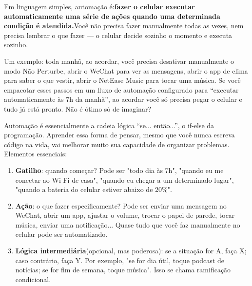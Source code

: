 


Em linguagem simples, automação é:\textbf{fazer o celular executar automaticamente uma série de ações quando uma determinada condição é atendida.}Você não precisa fazer manualmente todas as vezes, nem precisa lembrar o que fazer — o celular decide sozinho o momento e executa sozinho.

Um exemplo: toda manhã, ao acordar, você precisa desativar manualmente o modo Não Perturbe, abrir o WeChat para ver as mensagens, abrir o app de clima para saber o que vestir, abrir o NetEase Music para tocar uma música. Se você empacotar esses passos em um fluxo de automação configurado para “executar automaticamente às 7h da manhã”, ao acordar você só precisa pegar o celular e tudo já está pronto. Não é ótimo só de imaginar?

Automação é essencialmente a cadeia lógica “se... então...”, o if-else da programação. Aprender essa forma de pensar, mesmo que você nunca escreva código na vida, vai melhorar muito sua capacidade de organizar problemas. Elementos essenciais:

\begin{enumerate}
  \item \textbf{Gatilho}: quando começar? Pode ser "todo dia às 7h", "quando eu me conectar ao Wi-Fi de casa", "quando eu chegar a um determinado lugar", "quando a bateria do celular estiver abaixo de 20\%".
  \item \textbf{Ação}: o que fazer especificamente? Pode ser enviar uma mensagem no WeChat, abrir um app, ajustar o volume, trocar o papel de parede, tocar música, enviar uma notificação... Quase tudo que você faz manualmente no celular pode ser automatizado.
  \item \textbf{Lógica intermediária}(opcional, mas poderosa): se a situação for A, faça X; caso contrário, faça Y. Por exemplo, "se for dia útil, toque podcast de notícias; se for fim de semana, toque música". Isso se chama ramificação condicional.
\end{enumerate}

